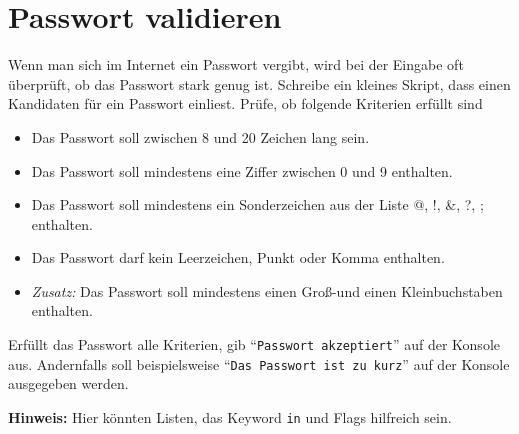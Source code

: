 \documentclass[a4paper]{article}
\begin{document}
\section{Passwort validieren}
Wenn man sich im Internet ein Passwort vergibt, wird bei der Eingabe oft überprüft, ob das Passwort stark genug ist. Schreibe ein kleines Skript, dass einen Kandidaten für ein Passwort einliest. Prüfe, ob folgende Kriterien erfüllt sind
\begin{itemize}
	\item Das Passwort soll zwischen 8 und 20 Zeichen lang sein.
	\item Das Passwort soll mindestens eine Ziffer zwischen 0 und 9 enthalten.
	\item Das Passwort soll mindestens ein Sonderzeichen aus der Liste @, !, \&, ?,  ; enthalten. 
	\item Das Passwort darf kein Leerzeichen, Punkt oder Komma enthalten. 
	\item \emph{Zusatz:} Das Passwort soll mindestens einen Groß-und einen Kleinbuchstaben enthalten. 
\end{itemize}
Erfüllt das Passwort alle Kriterien, gib \enquote{\texttt{Passwort akzeptiert}} auf der Konsole aus. Andernfalls soll beispielsweise \enquote{\texttt{Das Passwort ist zu kurz}} auf der Konsole ausgegeben werden. 

\vspace{2pt}
{\footnotesize\textbf{Hinweis:}
Hier könnten Listen, das Keyword \texttt{in} und Flags hilfreich sein. }
\end{document}
